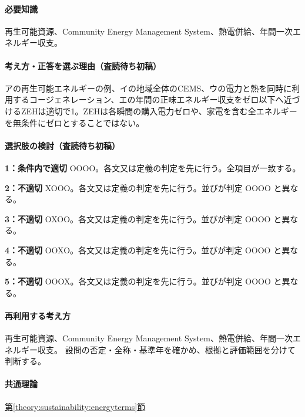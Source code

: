 \paragraph{必要知識} 再生可能資源、Community Energy Management System、熱電併給、年間一次エネルギー収支。

\paragraph{考え方・正答を選ぶ理由（査読待ち初稿）} アの再生可能エネルギーの例、イの地域全体のCEMS、ウの電力と熱を同時に利用するコージェネレーション、エの年間の正味エネルギー収支をゼロ以下へ近づけるZEHは適切で1。ZEHは各瞬間の購入電力ゼロや、家電を含む全エネルギーを無条件にゼロとすることではない。

\paragraph{選択肢の検討（査読待ち初稿）}\mbox{}\par

\noindent\textbf{1：条件内で適切} OOOO。各文又は定義の判定を先に行う。全項目が一致する。\par

\noindent\textbf{2：不適切} XOOO。各文又は定義の判定を先に行う。並びが判定 OOOO と異なる。\par

\noindent\textbf{3：不適切} OXOO。各文又は定義の判定を先に行う。並びが判定 OOOO と異なる。\par

\noindent\textbf{4：不適切} OOXO。各文又は定義の判定を先に行う。並びが判定 OOOO と異なる。\par

\noindent\textbf{5：不適切} OOOX。各文又は定義の判定を先に行う。並びが判定 OOOO と異なる。\par

\paragraph{再利用する考え方} 再生可能資源、Community Energy Management System、熱電併給、年間一次エネルギー収支。 設問の否定・全称・基準年を確かめ、根拠と評価範囲を分けて判断する。

\paragraph{共通理論} \hyperref[theory:sustainability:energyterms]{第\ref*{theory:sustainability:energyterms}節}

